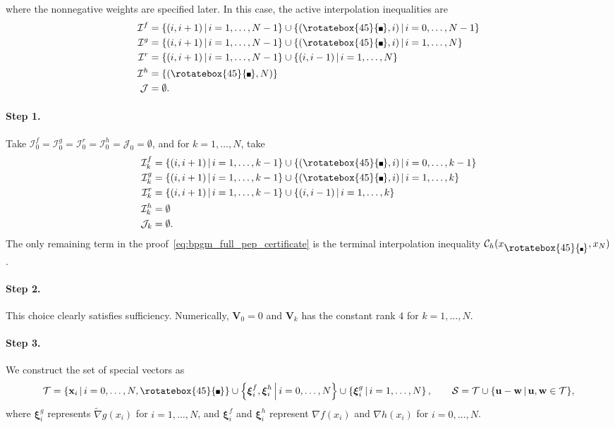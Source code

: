 \documentclass{article}
\theoremstyle{definition}
\theoremstyle{plain}
\newcommand{\vxi}{{\boldsymbol{\xi}}}
\newcommand{\vu}{{\mathbf{u}}}
\newcommand{\vw}{{\mathbf{w}}}
\newcommand{\vx}{{\mathbf{x}}}
\newcommand{\vV}{{\mathbf{V}}}
\newcommand{\cC}{{\mathcal{C}}}
\newcommand{\cI}{{\mathcal{I}}}
\newcommand{\cJ}{{\mathcal{J}}}
\newcommand{\cS}{{\mathcal{S}}}
\newcommand{\cT}{{\mathcal{T}}}
\newcommand{\tnabla}{\widetilde{\nabla}}
\newcommand{\compidx}{%
  \mathord{\mathchoice
    {\vcenter{\hbox{\rotatebox{45}{\rule{0.39em}{0.39em}}}}}
    {\vcenter{\hbox{\rotatebox{45}{\rule{0.39em}{0.39em}}}}}
    {\vcenter{\hbox{\rotatebox{45}{\rule{0.29em}{0.29em}}}}}
    {\vcenter{\hbox{\rotatebox{45}{\rule{0.23em}{0.23em}}}}}}%
}
\newcommand{\bregsm}{f}
\newcommand{\bregprox}{g}
\newcommand{\bregaux}{r}
\begin{document}
where the nonnegative weights are specified later.
In this case, the active interpolation inequalities are
\[
    \begin{aligned}
    \cI^{\bregsm} &= \{(i,i+1)\,|\,i=1,\dots,N-1\}\cup\{(\compidx,i)\,|\,i=0,\dots,N-1\} \\
    \cI^{\bregprox} &= \{(i,i+1)\,|\,i=1,\dots,N-1\}\cup\{(\compidx,i)\,|\,i=1,\dots,N\} \\
    \cI^{\bregaux} &= \{(i,i+1)\,|\,i=1,\dots,N-1\}\cup\{(i,i-1)\,|\,i=1,\dots,N\} \\
    \cI^h &= \{(\compidx,N)\} \\
    \cJ &= \emptyset .
    \end{aligned}
\]

\paragraph{Step 1.}
Take $\cI_0^{\bregsm}=\cI_0^{\bregprox}=\cI_0^{\bregaux}=\cI_0^h=\cJ_0=\emptyset$, and for $k=1,\dots,N$, take
\[
    \begin{aligned}
    \cI_k^{\bregsm} &= \{(i,i+1)\,|\,i=1,\dots,k-1\}\cup\{(\compidx,i)\,|\,i=0,\dots,k-1\} \\
    \cI_k^{\bregprox} &= \{(i,i+1)\,|\,i=1,\dots,k-1\}\cup\{(\compidx,i)\,|\,i=1,\dots,k\} \\
    \cI_k^{\bregaux} &= \{(i,i+1)\,|\,i=1,\dots,k-1\}\cup\{(i,i-1)\,|\,i=1,\dots,k\} \\
    \cI_k^h &= \emptyset \\
    \cJ_k &= \emptyset .
    \end{aligned}
\]
The only remaining term in the proof~\eqref{eq:bpgm_full_pep_certificate} is the terminal interpolation inequality $\cC_h(x_{\compidx},x_N)$.

\paragraph{Step 2.}
This choice clearly satisfies sufficiency.
Numerically, $\vV_0 = 0$ and $\vV_k$ has the constant rank $4$ for $k=1,\dots,N$.

\paragraph{Step 3.}
We construct the set of special vectors as
\[
    \cT = 
    \left\{\vx_i \,\middle|\, i=0,\dots,N,\compidx \right\}
    \cup \left\{\vxi_i^{\bregsm},\vxi_i^h \,\middle|\, i=0,\dots,N \right\}
    \cup \left\{\vxi_i^{\bregprox} \,\middle|\, i=1,\dots,N\right\},
    \qquad
    \cS = \cT \cup \{\vu-\vw \,|\, \vu,\vw\in\cT\},
\]
where $\vxi_i^{\bregprox}$ represents $\tnabla \bregprox(x_i)$ for $i=1,\dots,N$, and $\vxi_i^{\bregsm}$ and $\vxi_i^h$ represent $\nabla \bregsm(x_i)$ and $\nabla h(x_i)$ for $i=0,\dots,N$.
\end{document}
